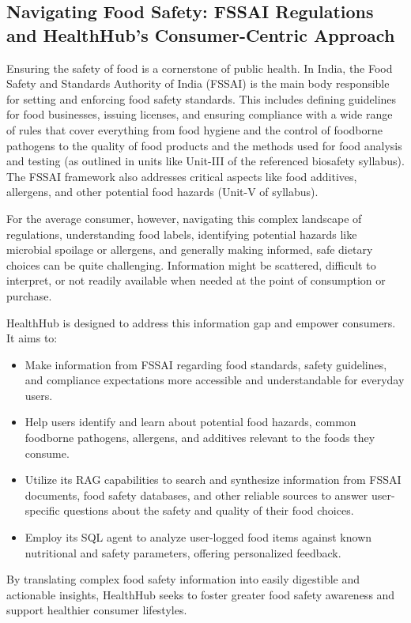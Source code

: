 \subsection{Navigating Food Safety: FSSAI Regulations and HealthHub's Consumer-Centric Approach}
Ensuring the safety of food is a cornerstone of public health. In India, the Food Safety and Standards Authority of India (FSSAI) is the main body responsible for setting and enforcing food safety standards. This includes defining guidelines for food businesses, issuing licenses, and ensuring compliance with a wide range of rules that cover everything from food hygiene and the control of foodborne pathogens to the quality of food products and the methods used for food analysis and testing (as outlined in units like Unit-III of the referenced biosafety syllabus). The FSSAI framework also addresses critical aspects like food additives, allergens, and other potential food hazards (Unit-V of syllabus).

For the average consumer, however, navigating this complex landscape of regulations, understanding food labels, identifying potential hazards like microbial spoilage or allergens, and generally making informed, safe dietary choices can be quite challenging. Information might be scattered, difficult to interpret, or not readily available when needed at the point of consumption or purchase.

HealthHub is designed to address this information gap and empower consumers. It aims to:
\begin{itemize}
    \item Make information from FSSAI regarding food standards, safety guidelines, and compliance expectations more accessible and understandable for everyday users.
    \item Help users identify and learn about potential food hazards, common foodborne pathogens, allergens, and additives relevant to the foods they consume.
    \item Utilize its RAG capabilities to search and synthesize information from FSSAI documents, food safety databases, and other reliable sources to answer user-specific questions about the safety and quality of their food choices.
    \item Employ its SQL agent to analyze user-logged food items against known nutritional and safety parameters, offering personalized feedback.
\end{itemize}
By translating complex food safety information into easily digestible and actionable insights, HealthHub seeks to foster greater food safety awareness and support healthier consumer lifestyles.

